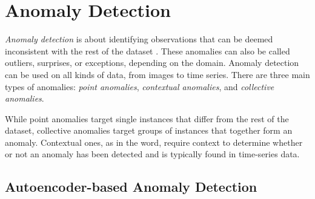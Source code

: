 \section{Anomaly Detection}
\label{back:anomdet}

\textit{Anomaly detection} is about identifying observations that can be deemed inconsistent with the rest of the dataset \cite{anomaly}. These anomalies can also be called outliers, surprises, or exceptions, depending on the domain. Anomaly detection can be used on all kinds of data, from images to time series. There are three main types of anomalies: \textit{point anomalies}, \textit{contextual anomalies}, and \textit{collective anomalies}.

While point anomalies target single instances that differ from the rest of the dataset, collective anomalies target groups of instances that together form an anomaly. Contextual ones, as in the word, require context to determine whether or not an anomaly has been detected and is typically found in time-series data.



\subsection{Autoencoder-based Anomaly Detection}

